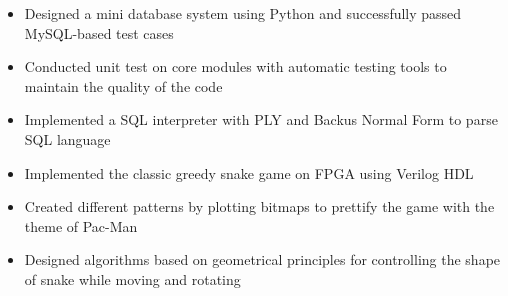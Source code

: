 \documentclass[12pt,a4paper,sans]{moderncv}   %
\begin{document}
{%
\begin{itemize}%
\item Designed a mini database system using Python and successfully passed MySQL-based test cases
%
\item Conducted unit test on core modules with automatic testing tools to maintain the quality of the code
%
\item Implemented a SQL interpreter with PLY and Backus Normal Form to parse SQL language
%
\end{itemize}
}

{%
\begin{itemize}%
\item Implemented the classic greedy snake game on FPGA using Verilog HDL%
\item Created different patterns by plotting bitmaps to prettify the game with the theme of Pac-Man
\item Designed algorithms based on geometrical principles for controlling the shape of snake while moving and rotating
\end{itemize}
}



\renewcommand{\listitemsymbol}{-~}            %


\nocite{*}



\end{document}
